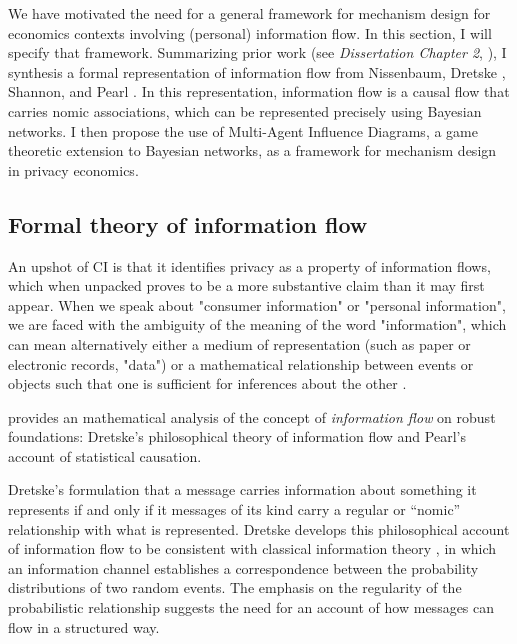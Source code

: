 \documentclass[../thesis.tex]{subfiles}
\begin{document}
We have motivated the need for a general framework
for mechanism design for economics contexts involving
(personal) information flow.
In this section, I will specify that framework.
Summarizing prior work (see \emph{Dissertation Chapter 2},
\cite{benthall2017origin}), I synthesis a formal representation
of information flow from Nissenbaum,
Dretske \cite{dretske1981knowledge},
Shannon,
and Pearl \cite{pearl1988probabilistic}.
In this representation, information flow is a causal flow
that carries nomic associations, which can be represented
precisely using Bayesian networks.
I then propose the use of Multi-Agent Influence Diagrams,
a game theoretic extension to Bayesian networks, as
a framework for mechanism design in privacy economics.
\cite{koller2003multi}

\subsection{Formal theory of information flow}

An upshot of CI is that it identifies privacy as a 
property of information flows, which when unpacked proves
to be a more substantive claim than it may first appear.
When we speak about "consumer information" or 
"personal information", we are faced with the ambiguity
of the meaning of the word "information", which can mean
alternatively either a medium of representation (such as
paper or electronic records, "data") or a mathematical
relationship between events or objects such that one
is sufficient for inferences about the other
\cite{nunberg1996farewell}.

\cite{benthall2017origin} provides an mathematical
analysis of the concept of \emph{information flow}
on robust foundations: Dretske's philosophical theory
of information flow and Pearl's account of statistical
causation.

Dretske's \cite{dretske1981knowledge} formulation
that a message carries information about something it represents
if and only if it messages of its kind carry a regular or ``nomic''
relationship with what is represented.
Dretske develops this philosophical account of information flow
to be consistent with classical information theory
\cite{shannon1948mathematical}, in which an information channel
establishes a correspondence between the probability distributions
of two random events.
The emphasis on the regularity of the probabilistic relationship
suggests the need for an account of how messages can flow
in a structured way.
\end{document}

